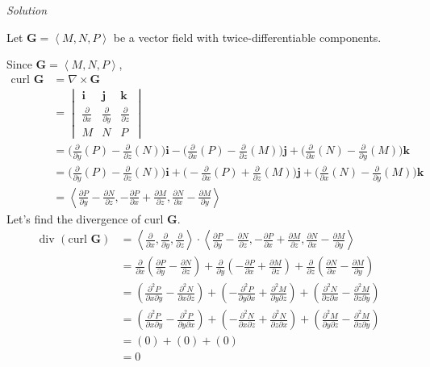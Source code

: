 \documentclass{article}
\newcommand{\lrp}[1]{\left( #1 \right)}
\newcommand{\lra}[1]{\left\langle #1 \right\rangle}
\renewcommand{\i}[0]{\mathbf{{i}}}
\renewcommand{\j}[0]{\mathbf{{j}}}
\renewcommand{\k}[0]{\mathbf{{k}}}
\newcommand{\G}[0]{\mathbf{G}}
\newcommand{\Solution}{\textit{Solution}}
\begin{document}
\Solution

Let $\G=\lra{M,N,P}$ be a vector field with twice-differentiable components.

Since $\G=\lra{M,N,P}$,
\begin{align*}
   \text{curl }\G&= \nabla \times \mathbf{G} \\
   &=\begin{vmatrix}\i & \j & \k\\ \frac{\partial}{\partial x} & \frac{\partial}{\partial y}& \frac{\partial}{\partial z}\\ M & N & P\end{vmatrix}\\
    &=\Bigg(\frac{\partial }{\partial y}(P)-\frac{\partial }{\partial z}(N)\Bigg)\i-\Bigg(\frac{\partial}{\partial x}(P)-\frac{\partial}{\partial z}(M)\Bigg)\j+\Bigg(\frac{\partial}{\partial x}(N)-\frac{\partial}{\partial y}(M)\Bigg)\k\\
     &=\Bigg(\frac{\partial }{\partial y}(P)-\frac{\partial }{\partial z}(N)\Bigg)\i+\Bigg(-\frac{\partial}{\partial x}(P)+\frac{\partial}{\partial z}(M)\Bigg)\j+\Bigg(\frac{\partial}{\partial x}(N)-\frac{\partial}{\partial y}(M)\Bigg)\k\\
    &=\lra{\frac{\partial P}{\partial y}-\frac{\partial N}{\partial z}, -\frac{\partial P}{\partial x}+\frac{\partial M}{\partial z},\frac{\partial N}{\partial x}-\frac{\partial M}{\partial y}}
\end{align*}
Let's find the divergence of $\text{curl } \G$.
\begin{align*}
    \text{div }\lrp{\text{curl } \G}&=\lra{\frac{\partial}{\partial x},\frac{\partial}{\partial y},\frac{\partial}{\partial z}}\cdot \lra{\frac{\partial P}{\partial y}-\frac{\partial N}{\partial z}, -\frac{\partial P}{\partial x}+\frac{\partial M}{\partial z},\frac{\partial N}{\partial x}-\frac{\partial M}{\partial y}}\\
    &=\frac{\partial }{\partial x}\lrp{ \frac{\partial P}{\partial y}-\frac{\partial N}{\partial z}}+\frac{\partial }{\partial y}\lrp{- \frac{\partial P}{\partial x}+\frac{\partial M}{\partial z}}+\frac{\partial }{\partial z}\lrp{ \frac{\partial N}{\partial x}-\frac{\partial M}{\partial y}}\\
    &=\lrp{\frac{\partial^2 P}{\partial x \partial y}- \frac{\partial ^2 N}{\partial x\partial z}}+\lrp{-\frac{\partial^2 P}{\partial y \partial x}+ \frac{\partial ^2 M}{\partial y\partial z}}+\lrp{\frac{\partial^2 N}{\partial z \partial x}- \frac{\partial ^2 M}{\partial z\partial y}}\\
    &= \lrp{\frac{\partial ^2 P}{\partial x \partial y}-\frac{\partial ^2 P}{\partial y \partial x}}+\lrp{-\frac{\partial^2 N}{\partial x\partial z}+\frac{\partial^2 N}{\partial z\partial x}}+\lrp{\frac{\partial ^2 M}{\partial y\partial z}-\frac{\partial^2 M}{\partial z\partial y}}\tag{rearrange}\\
    &=\lrp{0}+\lrp{0}+\lrp{0}\tag{mixed second partial derivatives are equal}\\
    &=0
\end{align*}
\end{document}

